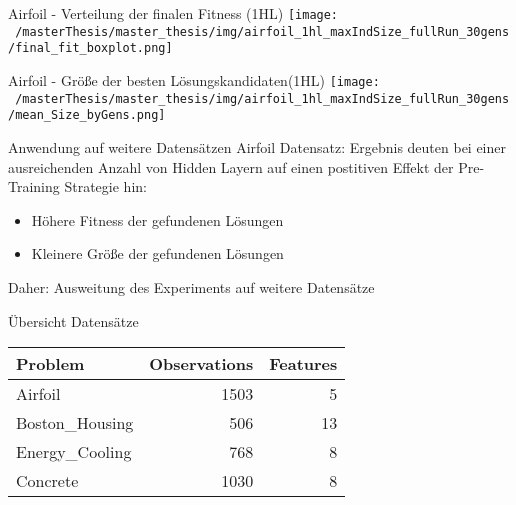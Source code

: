 \documentclass[
  ignorenonframetext,
]{beamer}
\providecommand{\tightlist}{%
  \setlength{\itemsep}{0pt}\setlength{\parskip}{0pt}}
\begin{document}
\begin{frame}{Airfoil - Verteilung der finalen Fitness (1HL)}
\protect\hypertarget{airfoil---verteilung-der-finalen-fitness-1hl}{}
\texttt{[image: ~/masterThesis/master\_thesis/img/airfoil\_1hl\_maxIndSize\_fullRun\_30gens/final\_fit\_boxplot.png]}
\end{frame}

\begin{frame}{Airfoil - Größe der besten Lösungskandidaten(1HL)}
\protect\hypertarget{airfoil---gruxf6uxdfe-der-besten-luxf6sungskandidaten1hl}{}
\texttt{[image: ~/masterThesis/master\_thesis/img/airfoil\_1hl\_maxIndSize\_fullRun\_30gens/mean\_Size\_byGens.png]}
\end{frame}

\begin{frame}{Anwendung auf weitere Datensätzen}
\protect\hypertarget{anwendung-auf-weitere-datensuxe4tzen}{}
Airfoil Datensatz: Ergebnis deuten bei einer ausreichenden Anzahl von
Hidden Layern auf einen postitiven Effekt der Pre-Training Strategie
hin:

\begin{itemize}
\tightlist
\item
  Höhere Fitness der gefundenen Lösungen
\item
  Kleinere Größe der gefundenen Lösungen
\end{itemize}

Daher: Ausweitung des Experiments auf weitere Datensätze
\end{frame}

\begin{frame}{Übersicht Datensätze}
\protect\hypertarget{uxfcbersicht-datensuxe4tze}{}
\begin{table}[!h]
\centering
\begin{tabular}{l|r|r}
\hline
\textbf{Problem} & \textbf{Observations} & \textbf{Features}\\
\hline
Airfoil & 1503 & 5\\
\hline
Boston\_Housing & 506 & 13\\
\hline
Energy\_Cooling & 768 & 8\\
\hline
Concrete & 1030 & 8\\
\hline
\end{tabular}
\end{table}
\end{frame}
\end{document}
